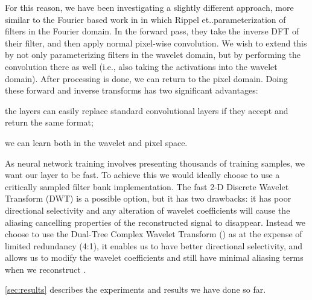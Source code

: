 \documentclass[9pt]{article}
\begin{document}
For this reason, we have been investigating a slightly different approach, more similar to the Fourier based work in
\cite{rippel_spectral_2015} in which Rippel et.\al.\investigate parameterization of filters in the Fourier
domain. In the forward pass, they take the inverse DFT of their filter,
and then apply normal pixel-wise convolution. We wish to extend this by not only parameterizing
filters in the wavelet domain, but by performing the convolution there as well
(i.e., also taking the activations into the wavelet domain). After 
processing is done, we can return to the pixel domain. Doing these forward
and inverse transforms has two significant advantages: 
\begin{enumerate*}[label=\roman*)]
  \item the layers can easily replace standard convolutional layers if they accept and return the
    same format;
  \item we can learn both in the wavelet and pixel space.
\end{enumerate*}

As neural network training involves presenting thousands of training samples, we want our layer to
be fast. To achieve this we would ideally choose to use a critically sampled filter bank
implementation. The fast 2-D Discrete Wavelet Transform (DWT) is a possible option, but it has two
drawbacks: it has poor directional selectivity and any alteration of wavelet coefficients will cause
the aliasing cancelling properties of the reconstructed signal to disappear.  Instead we choose to
use the Dual-Tree Complex Wavelet Transform (\DTCWT) \cite{selesnick_dual-tree_2005} as at the
expense of limited redundancy (4:1), it enables us to have better directional selectivity, and allows
us to modify the wavelet coefficients and still have minimal aliasing terms when we reconstruct
\cite{kingsbury_complex_2001}.

\autoref{sec:results} describes the experiments and results we have done so far.
\end{document}
